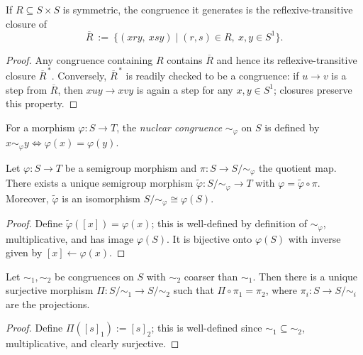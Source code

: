 \begin{lemma}
\label{lem:generated-congruence-description}
If \(R\subseteq S\times S\) is symmetric, the congruence it generates is the reflexive-transitive closure of
\[
\overline{R}\ :=\ \{(x r y,\ x s y)\mid (r,s)\in R,\ x,y\in S^1\}.
\]
\end{lemma}
\begin{proof}
Any congruence containing \(R\) contains \(\overline{R}\) and hence its reflexive-transitive closure \(\overline{R}^{\,*}\). Conversely, \(\overline{R}^{\,*}\) is readily checked to be a congruence: if \(u\to v\) is a step from \(\overline{R}\), then \(x u y\to x v y\) is again a step for any \(x,y\in S^1\); closures preserve this property.
\end{proof}

\begin{definition}
\label{def:nuclear-congruence}
For a morphism \(\varphi:S\to T\), the \emph{nuclear congruence} \(\sim_\varphi\) on \(S\) is defined by \(x\sim_\varphi y \iff \varphi(x)=\varphi(y)\).
\end{definition}

\begin{theorem}
\label{thm:first-isomorphism}
Let \(\varphi:S\to T\) be a semigroup morphism and \(\pi:S\to S/{\sim_\varphi}\) the quotient map. There exists a unique semigroup morphism \(\widetilde{\varphi}:S/{\sim_\varphi}\to T\) with \(\varphi=\widetilde{\varphi}\circ \pi\). Moreover, \(\widetilde{\varphi}\) is an isomorphism \(S/{\sim_\varphi}\cong \varphi(S)\).
\end{theorem}
\begin{proof}
Define \(\widetilde{\varphi}([x])=\varphi(x)\); this is well-defined by definition of \(\sim_\varphi\), multiplicative, and has image \(\varphi(S)\). It is bijective onto \(\varphi(S)\) with inverse given by \([x]\leftarrow \varphi(x)\).
\end{proof}

\begin{theorem}
\label{thm:second-isomorphism}
Let \(\sim_1,\sim_2\) be congruences on \(S\) with \(\sim_2\) coarser than \(\sim_1\). Then there is a unique surjective morphism \(\Pi:S/{\sim_1}\to S/{\sim_2}\) such that \(\Pi\circ \pi_1=\pi_2\), where \(\pi_i:S\to S/{\sim_i}\) are the projections.
\end{theorem}
\begin{proof}
Define \(\Pi([s]_1):=[s]_2\); this is well-defined since \(\sim_1\subseteq \sim_2\), multiplicative, and clearly surjective.
\end{proof}

